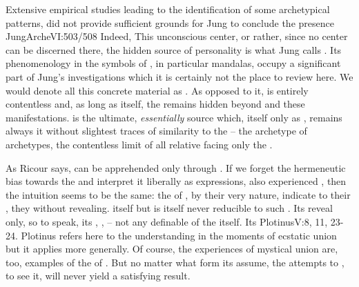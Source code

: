 \pa Extensive empirical studies leading to the identification of some
archetypical patterns, did not provide sufficient grounds for Jung to conclude
the presence \citet{in the unconscious [of] an order equivalent to that of the
  ego.  It certainly does not look as if we were likely to discover an
  unconscious ego-personality. [...]  Personality need not imply consciousness.
  It can just as easily be dormant or dreaming.}{JungArche}{VI:503/508} Indeed,
 This unconscious center, or rather, since no
center can be discerned there, the hidden source of personality is what Jung
calls .  Its phenomenology in the symbols of , in
particular mandalas, occupy a significant part of Jung's investigations which it
is certainly not the place to review here.  We would denote all this concrete
material as .  As opposed to it,  is entirely contentless
and, as long as  itself, the  remains hidden
beyond and  these manifestations.   is the ultimate, {\em
  essentially}  source which,  itself only as , remains always  it without slightest traces of similarity to
the  -- the archetype of archetypes, the contentless limit
of all relative  facing only the  .

As Ricour says,  can be apprehended only through . If we
forget the hermeneutic bias towards the  and interpret it liberally as
 expressions, also experienced , then the intuition
seems to be the same: the  of , by their very nature,
indicate  to their , they  without
revealing.    itself
but is itself never reducible to such .  Its
 reveal only, so to speak, its , ,
 -- not any definable  of the  itself.
Its  \citet{is a kind of understanding and perception of our
  self, in which we must be very careful lest, wishing to perceive more, we do
  not stray away from our Self.}{Plotinus}{V:8, 11, 23-24.} Plotinus refers
here to the understanding in the moments of ecstatic union but it applies more
generally.  Of course, the experiences of mystical union are, too, examples of
the  of . But no matter what form its
 assume, the attempts to , to
 see it, will never yield a satisfying result.


